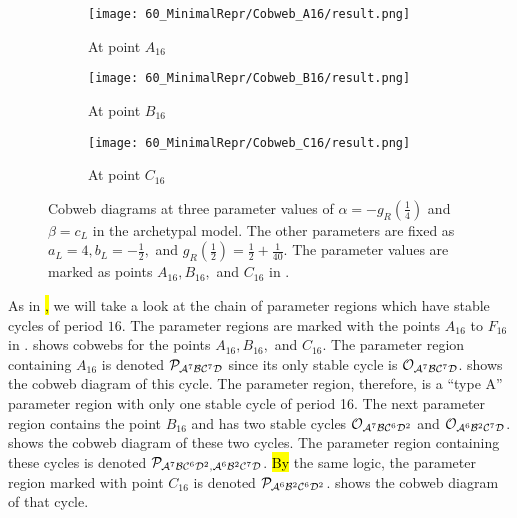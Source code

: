 \begin{figure}
	\centering
	\begin{subfigure}{0.3\textwidth}
		\centering
		\texttt{[image: 60\_MinimalRepr/Cobweb\_A16/result.png]}
		\caption{At point $A_{16}$}
		\label{fig:arch.dyn.cobweb.A}
	\end{subfigure}
	\begin{subfigure}{0.3\textwidth}
		\centering
		\texttt{[image: 60\_MinimalRepr/Cobweb\_B16/result.png]}
		\caption{At point $B_{16}$}
		\label{fig:arch.dyn.cobweb.B}
	\end{subfigure}
	\begin{subfigure}{0.3\textwidth}
		\centering
		\texttt{[image: 60\_MinimalRepr/Cobweb\_C16/result.png]}
		\caption{At point $C_{16}$}
		\label{fig:arch.dyn.cobweb.C}
	\end{subfigure}
	\caption[Cobweb diagrams of the archetypal model]{
		Cobweb diagrams at three parameter values of $\alpha = -g_R\left(\frac{1}{4}\right)$ and $\beta = c_L$ in the archetypal model.
		The other parameters are fixed as $a_L = 4, b_L = -\frac{1}{2},$ and $g_R\left(\frac{1}{2}\right) = \frac{1}{2} + \frac{1}{40}$.
		The parameter values are marked as points $A_{16}, B_{16},$ and $C_{16}$ in .
	}
	\label{fig:arch.dyn.cobwebs.1}
\end{figure}

As in\hl{ }\cite{akyuz2022}\hl{,} we will take a look at the chain of parameter regions which have stable cycles of period $16$.
The parameter regions are marked with the points $A_{16}$ to $F_{16}$ in .
 shows cobwebs for the points $A_{16}, B_{16},$ and $C_{16}$.
The parameter region containing $A_{16}$ is denoted $\mathcal{P}_{\mathcal{A}^7\mathcal{B}\mathcal{C}^7\mathcal{D}}$ since its only stable cycle is $\mathcal{O}_{\mathcal{A}^7\mathcal{B}\mathcal{C}^7\mathcal{D}}$.
 shows the cobweb diagram of this cycle.
The parameter region, therefore, is a ``type A'' parameter region with only one stable cycle of period 16.
The next parameter region contains the point $B_{16}$ and has two stable cycles $\mathcal{O}_{\mathcal{A}^7\mathcal{B}\mathcal{C}^6\mathcal{D}^2}$ and $\mathcal{O}_{\mathcal{A}^6\mathcal{B}^2\mathcal{C}^7\mathcal{D}}$.
 shows the cobweb diagram of these two cycles.
The parameter region containing these cycles is denoted $\mathcal{P}_{\mathcal{A}^7\mathcal{B}\mathcal{C}^6\mathcal{D}^2, \mathcal{A}^6\mathcal{B}^2\mathcal{C}^7\mathcal{D}}$.
\hl{By} the same logic, the parameter region marked with point $C_{16}$ is denoted $\mathcal{P}_{\mathcal{A}^6\mathcal{B}^2\mathcal{C}^6\mathcal{D}^2}$.
 shows the cobweb diagram of that cycle.

